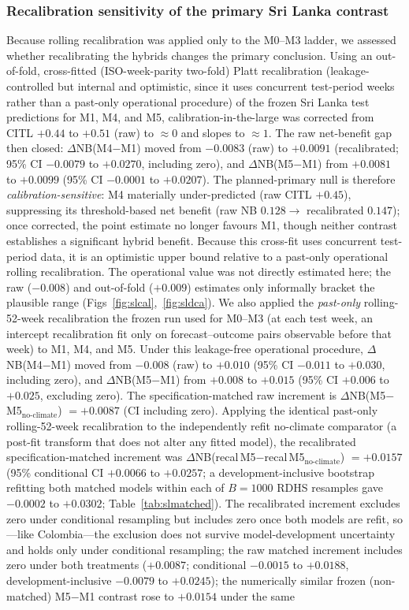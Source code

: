 \documentclass[11pt,a4paper]{article}
\begin{document}
\subsubsection*{Recalibration sensitivity of the primary Sri Lanka contrast}
Because rolling recalibration was applied only to the M0--M3 ladder, we assessed whether recalibrating the hybrids changes the primary conclusion. Using an out-of-fold, cross-fitted (ISO-week-parity two-fold) Platt recalibration (leakage-controlled but internal and optimistic, since it uses concurrent test-period weeks rather than a past-only operational procedure) of the frozen Sri Lanka test predictions for M1, M4, and M5, calibration-in-the-large was corrected from CITL $+0.44$ to $+0.51$ (raw) to $\approx0$ and slopes to $\approx1$. The raw net-benefit gap then closed: $\Delta$NB(M4$-$M1) moved from $-0.0083$ (raw) to $+0.0091$ (recalibrated; 95\% CI $-0.0079$ to $+0.0270$, including zero), and $\Delta$NB(M5$-$M1) from $+0.0081$ to $+0.0099$ (95\% CI $-0.0001$ to $+0.0207$). The planned-primary null is therefore \emph{calibration-sensitive}: M4 materially under-predicted (raw CITL $+0.45$), suppressing its threshold-based net benefit (raw NB $0.128\to$ recalibrated $0.147$); once corrected, the point estimate no longer favours M1, though neither contrast establishes a significant hybrid benefit. Because this cross-fit uses concurrent test-period data, it is an optimistic upper bound relative to a past-only operational rolling recalibration. The operational value was not directly estimated here; the raw ($-0.008$) and out-of-fold ($+0.009$) estimates only informally bracket the plausible range (Figs~\ref{fig:slcal},~\ref{fig:sldca}). We also applied the \emph{past-only} rolling-52-week recalibration the frozen run used for M0--M3 (at each test week, an intercept recalibration fit only on forecast--outcome pairs observable before that week) to M1, M4, and M5. Under this leakage-free operational procedure, $\Delta$NB(M4$-$M1) moved from $-0.008$ (raw) to $+0.010$ (95\% CI $-0.011$ to $+0.030$, including zero), and $\Delta$NB(M5$-$M1) from $+0.008$ to $+0.015$ (95\% CI $+0.006$ to $+0.025$, excluding zero). The specification-matched raw increment is $\Delta$NB(M5$-$M5$_{\text{no-climate}}$) $=+0.0087$ (CI including zero). Applying the identical past-only rolling-52-week recalibration to the independently refit no-climate comparator (a post-fit transform that does not alter any fitted model), the recalibrated specification-matched increment was $\Delta$NB(recal\,M5$-$recal\,M5$_{\text{no-climate}}$) $=+0.0157$ (95\% conditional CI $+0.0066$ to $+0.0257$; a development-inclusive bootstrap refitting both matched models within each of $B=1000$ RDHS resamples gave $-0.0002$ to $+0.0302$; Table~\ref{tab:slmatched}). The recalibrated increment excludes zero under conditional resampling but includes zero once both models are refit, so---like Colombia---the exclusion does not survive model-development uncertainty and holds only under conditional resampling; the raw matched increment includes zero under both treatments ($+0.0087$; conditional $-0.0015$ to $+0.0188$, development-inclusive $-0.0079$ to $+0.0245$); the numerically similar frozen (non-matched) M5$-$M1 contrast rose to $+0.0154$ under the same 
\end{document}
